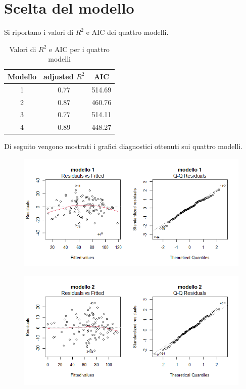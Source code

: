\section{Scelta del modello}
Si riportano i valori di $R^2$ e AIC dei quattro modelli.
\begin{table}[H]
	\centering
	\begin{tabular}{|c|c|c|}
		\hline
		\textbf{Modello} & \textbf{adjusted} \boldmath$R^2$ & \textbf{AIC} \\
		\hline
		1 &  0.77  & 514.69 \\
		2 & 0.87 & 460.76 \\
		3 & 0.77 & 514.11 \\
		4 & 0.89 & 448.27 \\
		\hline
	\end{tabular}
	\caption{Valori di $R^2$ e AIC per i quattro modelli}
\end{table}
Di seguito vengono mostrati i grafici diagnostici ottenuti sui quattro modelli.
\begin{figure}[H]
	\centering
	\includegraphics[width=1\linewidth]{../graphs/diagnostica/diagnostica_ridotto}

	\label{fig:diagnosticaridotto}
\end{figure}
\begin{figure}[H]
	\centering
	\includegraphics[width=1\linewidth]{../graphs/diagnostica/diagnostica_quadrato}

	\label{fig:diagnosticaridotto}
\end{figure}
